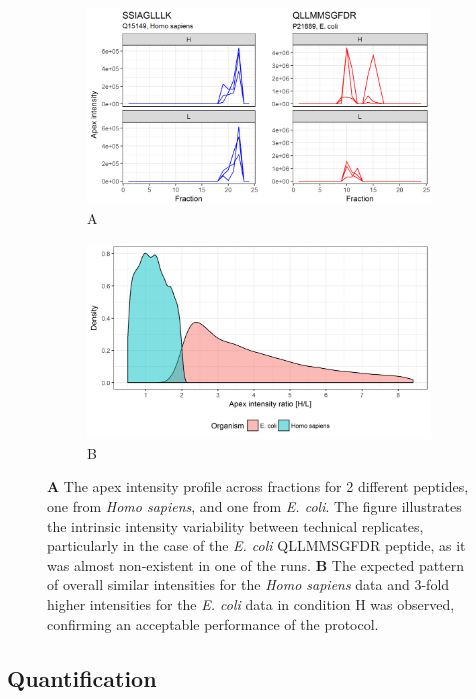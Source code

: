 \documentclass[11pt, a4paper]{report}
\begin{document}
\begin{figure}[!h]
\begin{subfigure}{.9\textwidth}
  \centering
    \caption*{A}
\includegraphics[width=.9\linewidth]{peptide_profile}
\end{subfigure}
\bigskip

\begin{subfigure}{.9\textwidth}
  \centering
    \caption*{B}
\includegraphics[width=.9\linewidth]{density_ratio}
\end{subfigure}
\caption{\textbf{A} The apex intensity profile across fractions for 2 different peptides, one from \textit{Homo sapiens}, and one from \textit{E. coli}. The figure illustrates the intrinsic intensity variability between technical replicates, particularly in the case of the \textit{E. coli} QLLMMSGFDR peptide, as it was almost non-existent in one of the runs. \textbf{B} The expected pattern of overall similar intensities for the \textit{Homo sapiens} data and 3-fold higher intensities for the \textit{E. coli} data in condition H was observed, confirming an acceptable performance of the protocol.}
\label{fig:apex_intensity}
\end{figure}


\subsection{Quantification}
\label{subsec:quantification}
\end{document}
